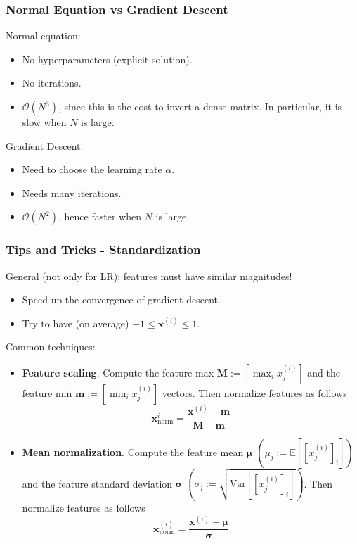 \documentclass{beamer}
\begin{document}
	\begin{frame}
		\frametitle{Normal Equation vs Gradient Descent}
		Normal equation:
		\begin{itemize}
			\item No hyperparameters (explicit solution).
			\item No iterations.
			\item $\mathcal{O}(N^3)$, since this is the cost to invert a dense matrix. In particular, it is slow when $N$ is large.
		\end{itemize}
	
		\vspace{5mm}
	
		Gradient Descent:
		\begin{itemize}
			\item Need to choose the learning rate $\alpha$.
			\item Needs many iterations.
			\item $\mathcal{O}(N^2)$, hence faster when $N$ is large.
		\end{itemize}
	\end{frame}


	\begin{frame}
		\frametitle{Tips and Tricks - Standardization}
		General (not only for LR): features must have similar magnitudes!
		\begin{itemize}
			\item Speed up the convergence of gradient descent.
			\item Try to have (on average) $-1 \leq \bm{x}^{(i)} \leq 1$.
		\end{itemize}
		Common techniques:
		\begin{itemize}
			\item \textbf{Feature scaling}. Compute the feature max $\bm{M} := [\max_i x^{(i)}_j]$ and the feature min $\bm{m} := [\min_i x^{(i)}_j]$ vectors. Then normalize features as follows
			\begin{equation*}
				\bm{x}_{\text{norm}}^i = \frac{\bm{x}^{(i)} - \bm{m}}{\bm{M} - \bm{m}}
			\end{equation*} 
			\item \textbf{Mean normalization}. Compute the feature mean $\bm{\mu}$ $(\mu_j := \mathbb{E}[[x^{(i)}_j]_i])$ and the feature standard deviation $\bm{\sigma}$ $(\sigma_j := \sqrt{\text{Var}[[x^{(i)}_j]_i]})$. Then normalize features as follows
			\begin{equation*}
				\bm{x}_{\text{norm}}^{(i)} = \frac{\bm{x}^{(i)} -\bm{\mu}}{\bm{\sigma}} 
			\end{equation*}
		\end{itemize}
	\end{frame}
\end{document}
